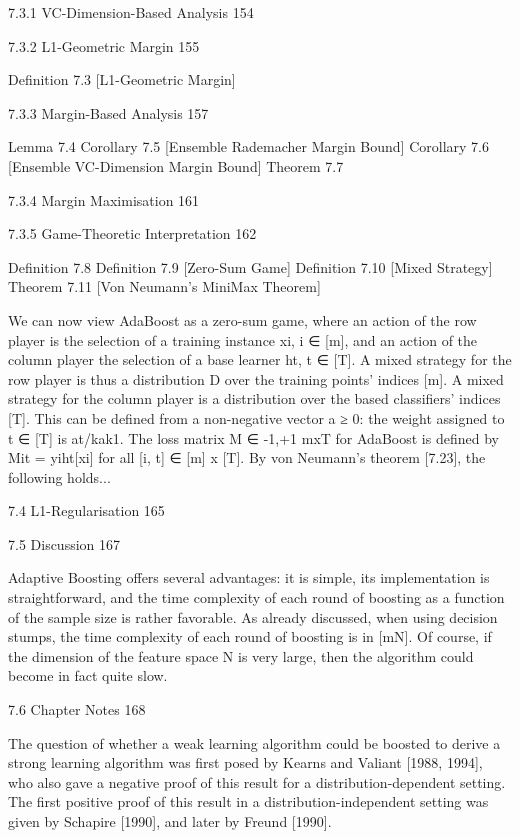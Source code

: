7.3.1 VC-Dimension-Based Analysis 154



7.3.2 L1-Geometric Margin 155

Definition 7.3 [L1-Geometric Margin]

7.3.3 Margin-Based Analysis 157

Lemma 7.4
Corollary 7.5 [Ensemble Rademacher Margin Bound]
Corollary 7.6 [Ensemble VC-Dimension Margin Bound]
Theorem 7.7

7.3.4 Margin Maximisation 161



7.3.5 Game-Theoretic Interpretation 162

Definition 7.8
Definition 7.9 [Zero-Sum Game]
Definition 7.10 [Mixed Strategy]
Theorem 7.11 [Von Neumann's MiniMax Theorem]

We can now view AdaBoost as a zero-sum game, where an action of the row player is the selection of a training instance xi, i ∈ [m], and an action of the column player the selection of a base learner ht, t ∈ [T]. A mixed strategy for the row player is thus a distribution D over the training points' indices [m]. A mixed strategy for the column player is a distribution over the based classifiers' indices [T]. This can be defined from a non-negative vector a ≥ 0: the weight assigned to t ∈ [T] is at/kak1. The loss matrix M ∈ {-1,+1} mxT for AdaBoost is defined by Mit = yiht[xi] for all [i, t] ∈ [m] x [T]. By von Neumann's theorem [7.23], the following holds...

7.4 L1-Regularisation 165



7.5 Discussion 167

Adaptive Boosting offers several advantages: it is simple, its implementation is straightforward, and the time complexity of each round of boosting as a function of the sample size is rather favorable. As already discussed, when using decision stumps, the time complexity of each round of boosting is in  [mN]. Of course, if the dimension of the feature space N is very large, then the algorithm could become in fact quite slow.

7.6 Chapter Notes 168

The question of whether a weak learning algorithm could be boosted to derive a strong learning algorithm was first posed by Kearns and Valiant [1988, 1994], who also gave a negative proof of this result for a distribution-dependent setting. The first positive proof of this result in a distribution-independent setting was given by Schapire [1990], and later by Freund [1990].

